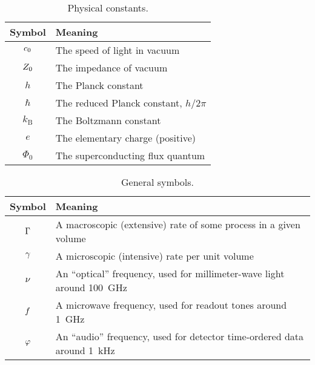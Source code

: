 \newcommand{\lsvac}{\lightspeed_\vacuum}
\newcommand{\impvac}{\impedance_\vacuum}
\newcommand{\planck}{h}
\newcommand{\kb}{k_\mathrm{B}}
\newcommand{\unitcharge}{e}
\newcommand{\fluxquantum}{\Phi_0}

\begin{table}[tb]
\centering
\caption
{Physical constants.}
\renewcommand{\arraystretch}{1.2}
\begin{tabular}{c l}
\toprule
Symbol & Meaning \\
\midrule
$\lsvac$ & The speed of light in vacuum \\ 
$\impvac$ & The impedance of vacuum \\
$\planck$ & The Planck constant \\
$\hbar$ & The reduced Planck constant, $\planck / 2 \pi$ \\
$\kb$ & The Boltzmann constant \\
$\unitcharge$ & The elementary charge (positive) \\
$\fluxquantum$ & The superconducting flux quantum \\
\bottomrule
\end{tabular}
\label{tab:notation.physical_constants}
\end{table}

\newcommand{\scalefactor}{a}
\newcommand{\redshift}{z}
\newcommand{\wavelength}{\lambda}

\newcommand{\photonoccupancy}{n}
\newcommand{\detectiontime}{\tau}
\newcommand{\tracewidth}{w}
\newcommand{\tracelength}{\ell}
\newcommand{\thickness}{d}
\newcommand{\distance}{d}
\newcommand{\vortexnumber}{N}
\newcommand{\forwardscattering}{S_{21}}
\newcommand{\amplifierwhite}{A}
\newcommand{\detectorwhite}{W}
\newcommand{\detectorred}{R}
\newcommand{\responseqpoccupancy}{K}
\newcommand{\normresponse}{\Upsilon}
\newcommand{\ssnormresponse}{\overline{\normresponse}}
\newcommand{\jonasbeta}{\beta}

\begin{table}[tb]
\centering
\caption
{General symbols.}
\renewcommand{\arraystretch}{1.2}
\begin{tabular}{c l}
\toprule
Symbol & Meaning \\
\midrule
$\Gamma$ & A macroscopic (extensive) rate of some process in a given volume \\
$\gamma$ & A microscopic (intensive) rate per unit volume \\
$\nu$ & An ``optical'' frequency, used for millimeter-wave light around \SI{100}{GHz} \\
$f$ & A microwave frequency, used for readout tones around \SI{1}{GHz} \\
$\varphi$ & An ``audio'' frequency, used for detector time-ordered data around \SI{1}{kHz} \\
\bottomrule
\end{tabular}
\label{tab:notation.general}
\end{table}

